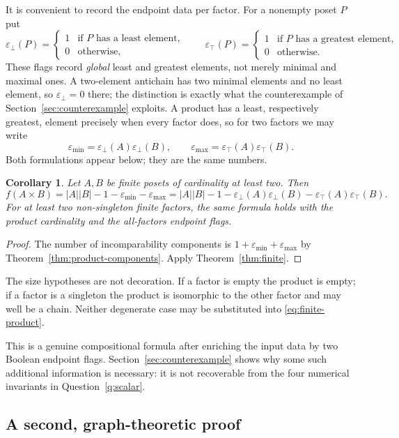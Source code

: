\documentclass[11pt,letterpaper]{article}
\newtheorem{corollary}[theorem]{Corollary}
\theoremstyle{definition}
\theoremstyle{remark}
\newcommand{\epsmin}{\varepsilon_{\min}}
\newcommand{\epsmax}{\varepsilon_{\max}}
\newcommand{\epsbot}{\varepsilon_{\bot}}
\newcommand{\epstop}{\varepsilon_{\top}}
\begin{document}
It is convenient to record the endpoint data per factor. For a nonempty
poset $P$ put
\[
 \epsbot(P)=\begin{cases}1&\text{if $P$ has a least element},\\0&\text{otherwise},\end{cases}
 \qquad
 \epstop(P)=\begin{cases}1&\text{if $P$ has a greatest element},\\0&\text{otherwise}.\end{cases}
\]
These flags record \emph{global} least and greatest elements, not merely
minimal and maximal ones. A two-element antichain has two minimal elements
and no least element, so $\epsbot=0$ there; the distinction is exactly what
the counterexample of Section~\ref{sec:counterexample} exploits. A product
has a least,
respectively greatest, element precisely when every factor does, so for two
factors we may write
\[
 \epsmin=\epsbot(A)\epsbot(B),
 \qquad
 \epsmax=\epstop(A)\epstop(B).
\]
Both formulations appear below; they are the same numbers.

\begin{corollary}\label{cor:finite-product}
Let $A,B$ be finite posets of cardinality at least two. Then
\begin{equation}\label{eq:finite-product}
 \boxed{f(A\times B)=|A||B|-1-\epsmin-\epsmax
  =|A||B|-1-\epsbot(A)\epsbot(B)-\epstop(A)\epstop(B).}
\end{equation}
For at least two non-singleton finite factors, the same formula holds
with the product cardinality and the all-factors endpoint flags.
\end{corollary}
\begin{proof}
The number of incomparability components is
$1+\epsmin+\epsmax$ by Theorem~\ref{thm:product-components}. Apply
Theorem~\ref{thm:finite}.
\end{proof}

The size hypotheses are not decoration. If a factor is empty the product is
empty; if a factor is a singleton the product is isomorphic to the other
factor and may well be a chain. Neither degenerate case may be substituted
into \eqref{eq:finite-product}.

This is a genuine compositional formula after enriching the input data by
two Boolean endpoint flags. Section~\ref{sec:counterexample} shows why some
such additional information is necessary: it is not recoverable from the
four numerical invariants in Question~\ref{q:scalar}.

\subsection{A second, graph-theoretic proof}\label{sec:grid-proof}
\end{document}
